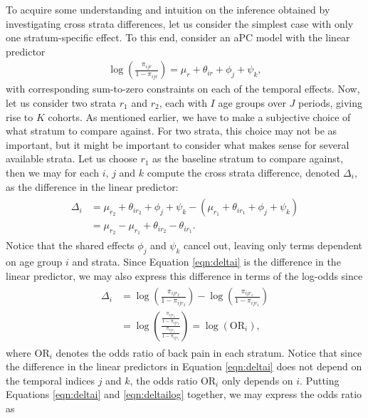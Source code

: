 \vspace{-0.2cm}
To acquire some understanding and intuition on the inference obtained by investigating cross strata differences, let us consider the simplest case with only one stratum-specific effect. To this end, consider an aPC model with the linear predictor
\begin{align}
    \log\left({\frac{\pi_{ijr}}{1-\pi_{ijr}}}\right) = \mu_r + \theta_{ir} + \phi_j + \psi_k,
\end{align}
with corresponding sum-to-zero constraints on each of the temporal effects. Now, let us consider two strata $r_1$ and $r_2$, each with $I$ age groups over $J$ periods, giving rise to $K$ cohorts. As mentioned earlier, we have to make a subjective choice of what stratum to compare against. For two strata, this choice may not be as important, but it might be important to consider what makes sense for several available strata. Let us choose $r_1$ as the baseline stratum to compare against, then we may for each $i$, $j$ and $k$ compute the cross strata difference, denoted $\Delta_{i}$, as the difference in the linear predictor:
\begin{align}
    \begin{split}
    \Delta_{i} &= \mu_{r_2} + \theta_{ir_2} + \phi_{j} + \psi_{k} - (\mu_{r_1} + \theta_{ir_1} + \phi_{j} + \psi_{k})\\
    & = \mu_{r_2} - \mu_{r_1 } + \theta_{ir_2} - \theta_{ir_1}.
    \end{split}
    \label{eqn:deltai}
\end{align}
Notice that the shared effects $\phi_j$ and $\psi_k$ cancel out, leaving only terms dependent on age group $i$ and strata. Since Equation \eqref{eqn:deltai} is the difference in the linear predictor, we may also express this difference in terms of the log-odds since
\begin{align}
    \begin{split}
    \Delta_{i} &= \log\left(\frac{\pi_{ijr_2}}{1-\pi_{ijr_2}} \right) - \log\left(\frac{\pi_{ijr_1}}{1-\pi_{ijr_1}} \right)\\ &= \log\left(\frac{\frac{\pi_{ijr_2}}{1-\pi_{ijr_2}}}{\frac{\pi_{ijr_1}}{1-\pi_{ijr_1}}}\right)=\log\left(\text{OR}_i\right),
    \end{split}
    \label{eqn:deltailog}
\end{align}
where $\text{OR}_i$ denotes the odds ratio of back pain in each stratum. Notice that since the difference in the linear predictors in Equation \eqref{eqn:deltai} does not depend on the temporal indices $j$ and $k$, the odds ratio $\text{OR}_i$ only depends on $i$. Putting Equations \eqref{eqn:deltai} and \eqref{eqn:deltailog} together, we may express the odds ratio as
